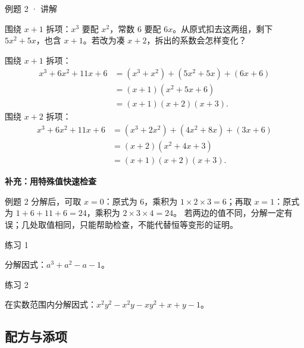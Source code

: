 \begin{solution}{例题 2 · 讲解}

 围绕 $x+1$ 拆项：$x^3$ 要配 $x^2$，常数 $6$ 要配 $6x$。从原式扣去这两组，剩下 $5x^2+5x$，也含 $x+1$。若改为凑 $x+2$，拆出的系数会怎样变化？

\solve 围绕 $x+1$ 拆项：
\begin{align*}
x^3+6x^2+11x+6&=(x^3+x^2)+(5x^2+5x)+(6x+6)\\
&=(x+1)(x^2+5x+6)\\
&=(x+1)(x+2)(x+3).
\end{align*}
围绕 $x+2$ 拆项：
\begin{align*}
x^3+6x^2+11x+6&=(x^3+2x^2)+(4x^2+8x)+(3x+6)\\
&=(x+2)(x^2+4x+3)\\
&=(x+1)(x+2)(x+3).
\end{align*}


\end{solution}

\ifstudentnotes\else
\begin{tcolorbox}[knotweld,breakable=false]
\textbf{补充：用特殊值快速检查}\par\smallskip
例题 2 分解后，可取 $x=0$：原式为 $6$，乘积为 $1\times2\times3=6$；再取 $x=1$：原式为 $1+6+11+6=24$，乘积为 $2\times3\times4=24$。
若两边的值不同，分解一定有误；几处取值相同，只能帮助检查，不能代替恒等变形的证明。
\end{tcolorbox}
\fi


\begin{problem}{练习 1}

分解因式：$a^3+a^2-a-1$。

\end{problem}

\begin{problem}{练习 2}

在实数范围内分解因式：$x^2y^2-x^2y-xy^2+x+y-1$。

\end{problem}


\subsection{配方与添项}

